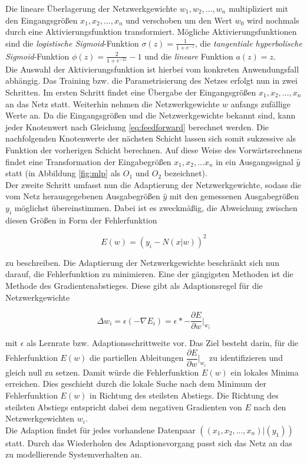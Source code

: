 Die lineare Überlagerung der Netzwerkgewichte $w_1,w_2,...,w_n$ multipliziert mit den Eingangsgrößen $x_1,x_2,...,x_n$ und verschoben um den Wert $w_0$ wird nochmals durch eine Aktivierungsfunktion transformiert. Mögliche Aktivierungsfunktionen sind die \textit{logistische Sigmoid}-Funktion $\sigma(z) = \frac{1}{1 + e^{-z}}$, die \textit{tangentiale hyperbolische Sigmoid}-Funktion $\phi(z)=\frac{2}{1 + e^{-2z}}-1$ und die \textit{lineare} Funktion $a(z)=z$. \\ 
Die Auswahl der Aktivierungsfunktion ist hierbei vom konkreten Anwendungsfall abhängig. Das Training bzw. die Parametrisierung des Netzes erfolgt nun in zwei Schritten. Im ersten Schritt findet eine Übergabe der Eingangsgrößen $x_1,x_2,...,x_n$ an das Netz statt. Weiterhin nehmen die Netzwerkgewichte $w$ anfangs zufällige Werte an. Da die Eingangsgrößen und die Netzwerkgewichte bekannt sind, kann jeder Knotenwert nach Gleichung \ref{eq:feedforward} berechnet werden. Die nachfolgenden Knotenwerte der nächsten Schicht lassen sich somit sukzessive als Funktion der vorherigen Schicht berechnen. Auf diese Weise des Vorwärtsrechnens findet eine Transformation der Eingabegrößen $x_1,x_2,...x_n$ in ein Ausgangssignal $\hat{y}$ statt (in Abbildung \ref{fig:mlp} als $O_1$ und $O_2$ bezeichnet). \\
Der zweite Schritt umfasst nun die Adaptierung der Netzwerkgewichte, sodass die vom Netz herausgegebenen Ausgabegrößen $\hat{y}$ mit den gemessenen Ausgabegrößen $y_i$ möglichst übereinstimmen. Dabei ist es zweckmäßig, die Abweichung zwischen diesen Größen in Form der Fehlerfunktion 

\begin{equation}
E(w) = (y_i-N(x|w))^{2}
\end{equation}

zu beschreiben. Die Adaptierung der Netzwerkgewichte beschränkt sich nun darauf, die Fehlerfunktion zu minimieren. Eine der gängigsten Methoden ist die Methode des Gradientenabstieges. Diese gibt als Adaptionsregel für die Netzwerkgewichte 

\begin{equation}
\label{eq:weight_adapt}
\Delta w_i = \epsilon  (-\nabla E_i) = \epsilon * - \dfrac{\partial E}{\partial w}\bigg|_{w_i}
\end{equation}

mit $\epsilon$ als Lernrate bzw. Adaptionsschrittweite vor. Das Ziel besteht darin, für die Fehlerfunktion $E(w)$ die partiellen Ableitungen $\dfrac{\partial E}{\partial w}\bigg|_{w_i}$ zu identifizieren und gleich null zu setzen. Damit würde die Fehlerfunktion $E(w)$ ein lokales Minima erreichen. Dies geschieht durch die lokale Suche nach dem Minimum der Fehlerfunktion $E(w)$ in Richtung des steilsten Abstiegs. Die Richtung des steilsten Abstiegs entspricht dabei dem negativen Gradienten von $E$ nach den Netzwerkgewichten $w_i$.\\ 
Die Adaption findet für jedes vorhandene Datenpaar $((x_1,x_2,...,x_n)|(y_1))$ statt. Durch das Wiederholen des Adaptionsvorgang passt sich das Netz an das zu modellierende Systemverhalten an. \\

